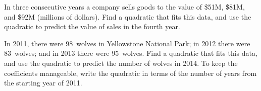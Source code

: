 \begin{exercise}  
In three consecutive years a company sells goods to the value of \$51M, \$81M, and \$92M (millions of dollars).
Find a quadratic that fits this data, and use the quadratic to predict the value of sales in the fourth year.
\end{exercise}




\begin{exercise}  
In 2011, there were 98~wolves in Yellowstone National Park; in 2012 there were 83~wolves; and in 2013 there were 95~wolves.
Find a quadratic that fits this data, and use the quadratic to predict the number of wolves in 2014.
To keep the coefficients manageable, write the quadratic in terms of the number of years from the starting year of 2011.
\end{exercise}








